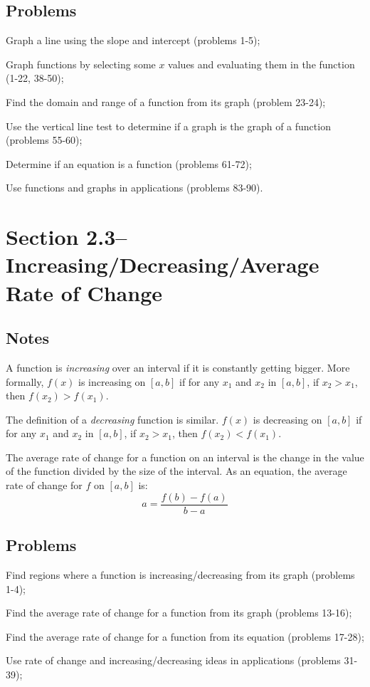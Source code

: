 \documentclass{article}
\begin{document}
\subsection{Problems}
\begin{itemize*}
  \item Graph a line using the slope and intercept (problems 1-5);
  \item Graph functions by selecting some $x$ values and evaluating them in the function (1-22, 38-50);
  \item Find the domain and range of a function from its graph (problem 23-24);
  \item Use the vertical line test to determine if a graph is the graph of a function (problems 55-60);
  \item Determine if an equation is a function (problems 61-72);
  \item Use functions and graphs in applications (problems 83-90).
\end{itemize*}

\section{Section 2.3--Increasing/Decreasing/Average Rate of Change}

\subsection{Notes}

A function is {\em increasing} over an interval if it is constantly getting bigger.  More formally, $f(x)$ is increasing
on $[a, b]$ if for any $x_1$ and $x_2$ in $[a, b]$, if $x_2 > x_1$, then $f(x_2) > f(x_1)$.

The definition of a {\em decreasing} function is similar.  $f(x)$ is decreasing on $[a, b]$ if for any $x_1$ and $x_2$
in $[a, b]$, if $x_2 > x_1$, then $f(x_2) < f(x_1)$.

The average rate of change for a function on an interval is the change in the value of the function divided by the size
of the interval.  As an equation, the average rate of change for $f$ on $[a, b]$ is:
\[
  a = \frac{f(b) - f(a)}{b - a}
\]

\subsection{Problems}
\begin{itemize*}
  \item Find regions where a function is increasing/decreasing from its graph (problems 1-4);
  \item Find the average rate of change for a function from its graph (problems 13-16);
  \item Find the average rate of change for a function from its equation (problems 17-28);
  \item Use rate of change and increasing/decreasing ideas in applications (problems 31-39);
\end{itemize*}
\end{document}
